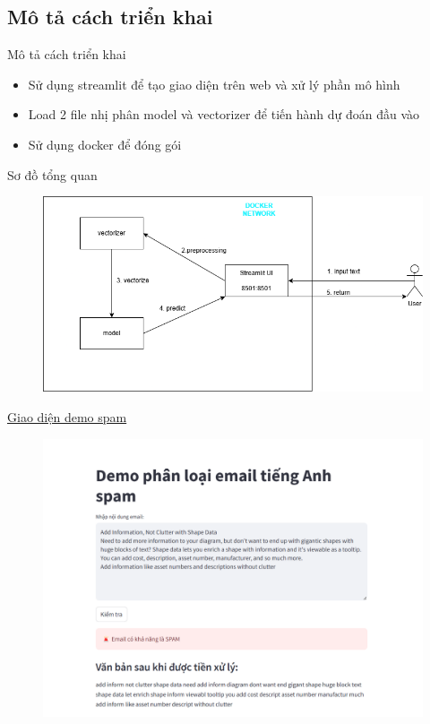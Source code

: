 \documentclass[serif, aspectratio=169]{beamer}
\begin{document}
	\subsection{Mô tả cách triển khai}
	\begin{frame}{Mô tả cách triển khai}
		\begin{itemize}
			\item Sử dụng streamlit để tạo giao diện trên web và xử lý phần mô hình
			\item Load 2 file nhị phân model và vectorizer để tiến hành dự đoán đầu vào
			\item Sử dụng docker để đóng gói
		\end{itemize}
		
	\end{frame}
	\begin{frame}{Sơ đồ tổng quan}
		\begin{figure}
			\centering
			\includegraphics[width=0.8\linewidth]{pic/demo-ai-sys.png}
			\label{fig:demo-ai-sys}
		\end{figure}
	\end{frame}
	\begin{frame}{\href{https://ai-svm-deploy.onrender.com}{Giao diện demo spam}}
		\begin{figure}
			\centering
			\includegraphics[width=0.6\linewidth]{pic/demo-spam.png}
			\label{fig:demo-spam}
		\end{figure}
	\end{frame}
\end{document}
